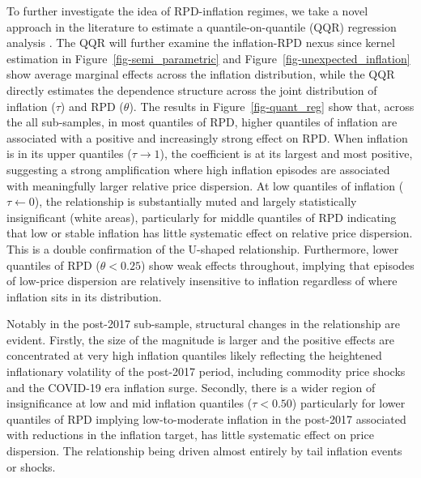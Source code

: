 \documentclass[
  letterpaper,
  DIV=11,
  numbers=noendperiod]{scrartcl}
\begin{document}
To further investigate the idea of RPD-inflation regimes, we take a
novel approach in the literature to estimate a quantile-on-quantile
(QQR) regression analysis \citep{koenker2017}. The QQR will further
examine the inflation-RPD nexus since kernel estimation in
Figure~\ref{fig-semi_parametric} and
Figure~\ref{fig-unexpected_inflation} show average marginal effects
across the inflation distribution, while the QQR directly estimates the
dependence structure across the joint distribution of inflation
(\(\tau\)) and RPD (\(\theta\)). The results in
Figure~\ref{fig-quant_reg} show that, across the all sub-samples, in
most quantiles of RPD, higher quantiles of inflation are associated with
a positive and increasingly strong effect on RPD. When inflation is in
its upper quantiles (\(\tau \rightarrow 1\)), the coefficient is at its
largest and most positive, suggesting a strong amplification where high
inflation episodes are associated with meaningfully larger relative
price dispersion. At low quantiles of inflation (\(\tau \leftarrow 0\)),
the relationship is substantially muted and largely statistically
insignificant (white areas), particularly for middle quantiles of RPD
indicating that low or stable inflation has little systematic effect on
relative price dispersion. This is a double confirmation of the U-shaped
relationship. Furthermore, lower quantiles of RPD (\(\theta < 0.25\))
show weak effects throughout, implying that episodes of low-price
dispersion are relatively insensitive to inflation regardless of where
inflation sits in its distribution.

Notably in the post-2017 sub-sample, structural changes in the
relationship are evident. Firstly, the size of the magnitude is larger
and the positive effects are concentrated at very high inflation
quantiles likely reflecting the heightened inflationary volatility of
the post-2017 period, including commodity price shocks and the COVID-19
era inflation surge. Secondly, there is a wider region of insignificance
at low and mid inflation quantiles (\(\tau < 0.50\)) particularly for
lower quantiles of RPD implying low-to-moderate inflation in the
post-2017 associated with reductions in the inflation target, has little
systematic effect on price dispersion. The relationship being driven
almost entirely by tail inflation events or shocks.
\end{document}

